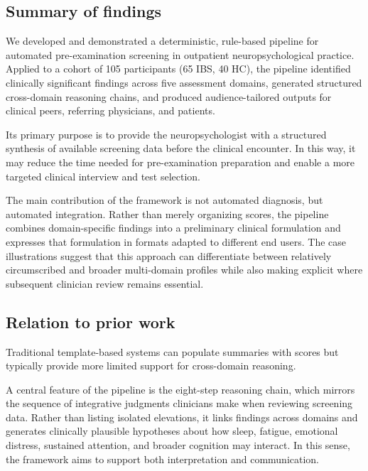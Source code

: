 \documentclass[11pt,a4paper]{article}
\begin{document}
\subsection{Summary of findings}

We developed and demonstrated a deterministic, rule-based pipeline for automated pre-ex\-am\-i\-na\-tion screening in outpatient neuropsychological practice. Applied to a cohort of 105 participants (65 IBS, 40 HC), the pipeline identified clinically significant findings across five assessment domains, generated structured cross-domain reasoning chains, and produced audience-tailored outputs for clinical peers, referring physicians, and patients.

Its primary purpose is to provide the neuropsychologist with a structured synthesis of available screening data before the clinical encounter. In this way, it may reduce the time needed for pre-examination preparation and enable a more targeted clinical interview and test selection.

The main contribution of the framework is not automated diagnosis, but automated integration. Rather than merely organizing scores, the pipeline combines domain-specific findings into a preliminary clinical formulation and expresses that formulation in formats adapted to different end users. 
The case illustrations suggest that this approach can differentiate between relatively circumscribed and broader multi-domain profiles while also making explicit where subsequent clinician review remains essential.

\subsection{Relation to prior work}

Traditional template-based systems can populate summaries with scores but typically provide more limited support for cross-domain reasoning.

A central feature of the pipeline is the eight-step reasoning chain, which mirrors the sequence of integrative judgments clinicians make when reviewing screening data. Rather than listing isolated elevations, it links findings across domains and generates clinically plausible hypotheses about how sleep, fatigue, emotional distress, sustained attention, and broader cognition may interact. In this sense, the framework aims to support both interpretation and communication.
\end{document}
